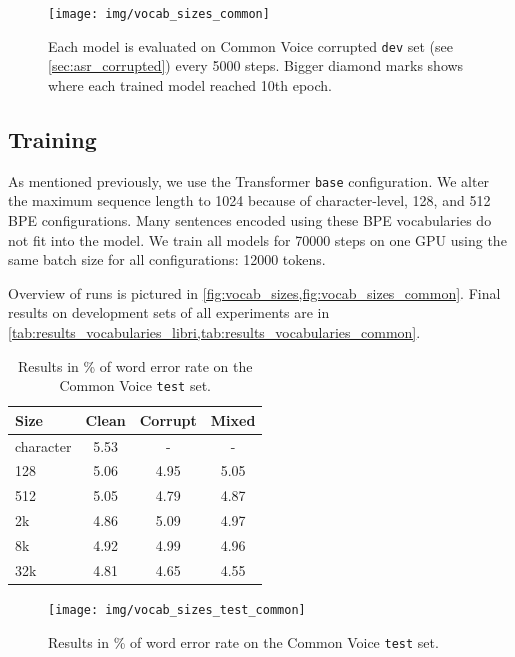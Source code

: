 \begin{figure}[p]
	\texttt{[image: img/vocab\_sizes\_common]}
	\caption{Each model is evaluated on Common Voice corrupted \texttt{dev} set (see \cref{sec:asr_corrupted}) every 5000 steps. Bigger diamond marks shows where each trained model reached 10th epoch.}
	\label{fig:vocab_sizes_common}
\end{figure}


\subsection{Training}

As mentioned previously, we use the Transformer \texttt{base} configuration. We alter the maximum sequence length to 1024 because of character-level, 128, and 512 BPE configurations. Many sentences encoded using these BPE vocabularies do not fit into the model. We train all models for 70000 steps on one GPU using the same batch size for all configurations: 12000 tokens. 

Overview of runs is pictured in \cref{fig:vocab_sizes,fig:vocab_sizes_common}. Final results on development sets of all experiments are in \cref{tab:results_vocabularies_libri,tab:results_vocabularies_common}.


\begin{table}[p]
	\centering
	\begin{tabular}{l|ccc}
		\bf Size & \bf Clean & \bf Corrupt & \bf Mixed \\
		\hline
		character    &    5.53    &    -    &    - \\
		128    &    5.06    &    4.95    &    5.05 \\
		512    &    5.05    &    4.79    &    4.87 \\
		2k    &    4.86    &    5.09    &    4.97 \\
		8k    &    4.92    &    4.99    &    4.96 \\
		32k    &    4.81    &    4.65    &    4.55 \\
		
	\end{tabular}
	
	\caption{Results in \% of word error rate on the Common Voice \texttt{test} set.}
	\label{tab:results_vocabularies_common_test}
\end{table}

\begin{figure}[p]
	\centering
	\texttt{[image: img/vocab\_sizes\_test\_common]}
	\caption{Results in \% of word error rate on the Common Voice \texttt{test} set.}
	\label{fig:vocab_sizes_common_graph}
\end{figure}


